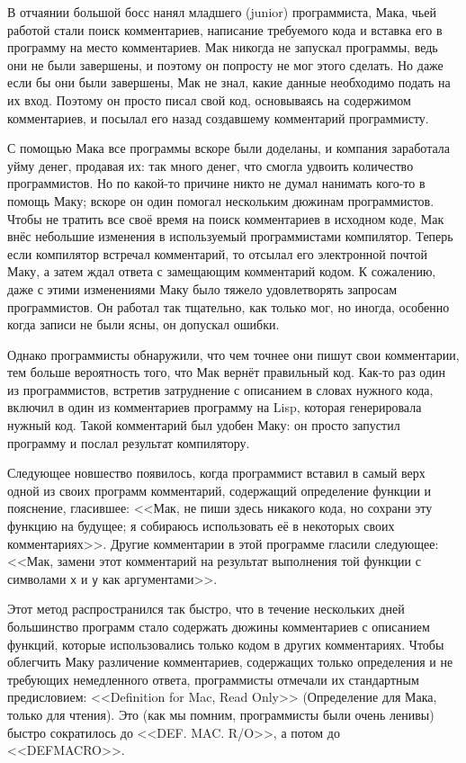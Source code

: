 В отчаянии большой босс нанял младшего (junior) программиста, Мака, чьей работой стали
поиск комментариев, написание требуемого кода и вставка его в программу на место
комментариев. Мак никогда не запускал программы, ведь они не были завершены, и поэтому он
попросту не мог этого сделать. Но даже если бы они были завершены, Мак не знал, какие
данные необходимо подать на их вход. Поэтому он просто писал свой код, основываясь на
содержимом комментариев, и посылал его назад создавшему комментарий программисту.

С помощью Мака все программы вскоре были доделаны, и компания заработала уйму денег,
продавая их: так много денег, что смогла удвоить количество программистов. Но по какой-то
причине никто не думал нанимать кого-то в помощь Маку; вскоре он один помогал нескольким
дюжинам программистов. Чтобы не тратить все своё время на поиск комментариев в исходном
коде, Мак внёс небольшие изменения в используемый программистами компилятор. Теперь если
компилятор встречал комментарий, то отсылал его электронной почтой Маку, а затем ждал
ответа с замещающим комментарий кодом. К сожалению, даже с этими изменениями Маку было
тяжело удовлетворять запросам программистов. Он работал так тщательно, как только мог, но
иногда, особенно когда записи не были ясны, он допускал ошибки.

Однако программисты обнаружили, что чем точнее они пишут свои комментарии, тем больше
вероятность того, что Мак вернёт правильный код. Как-то раз один из программистов,
встретив затруднение с описанием в словах нужного кода, включил в один из комментариев
программу на Lisp, которая генерировала нужный код. Такой комментарий был удобен Маку: он
просто запустил программу и послал результат компилятору.

Следующее новшество появилось, когда программист вставил в самый верх одной из своих
программ комментарий, содержащий определение функции и пояснение, гласившее: <<Мак, не пиши
здесь никакого кода, но сохрани эту функцию на будущее; я собираюсь использовать её в
некоторых своих комментариях>>. Другие комментарии в этой программе гласили следующее:
<<Мак, замени этот комментарий на результат выполнения той функции с символами \lstinline{x} и
\lstinline{y} как аргументами>>.

Этот метод распространился так быстро, что в течение нескольких дней большинство программ
стало содержать дюжины комментариев с описанием функций, которые использовались только
кодом в других комментариях. Чтобы облегчить Маку различение комментариев, содержащих
только определения и не требующих немедленного ответа, программисты отмечали их
стандартным предисловием: <<Definition for Mac, Read Only>> (Определение для Мака, только
для чтения). Это (как мы помним, программисты были очень ленивы) быстро сократилось до
<<DEF. MAC. R/O>>, а потом до <<DEFMACRO>>.

